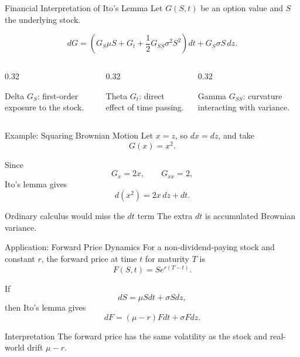\documentclass[aspectratio=169,11pt]{beamer}
\newcommand{\Ito}{Ito}
\begin{document}
\begin{frame}{Financial Interpretation of Ito's Lemma}
    Let \(G(S,t)\) be an option value and \(S\) the underlying stock.

    \[
        dG
        =
        \left(
            G_S\mu S+G_t+\frac{1}{2}G_{SS}\sigma^2S^2
        \right)dt
        +
        G_S\sigma S\,dz.
    \]

    \begin{columns}[T]
        \begin{column}{0.32\textwidth}
            \begin{block}{Delta}
                \(G_S\): first-order exposure to the stock.
            \end{block}
        \end{column}
        \begin{column}{0.32\textwidth}
            \begin{block}{Theta}
                \(G_t\): direct effect of time passing.
            \end{block}
        \end{column}
        \begin{column}{0.32\textwidth}
            \begin{block}{Gamma}
                \(G_{SS}\): curvature interacting with variance.
            \end{block}
        \end{column}
    \end{columns}
\end{frame}

\begin{frame}[label=ito_examples_main]{Example: Squaring Brownian Motion}
    Let \(x=z\), so \(dx=dz\), and take
    \[
        G(x)=x^2.
    \]

    Since
    \[
        G_x=2x,
        \qquad
        G_{xx}=2,
    \]
    \Ito's lemma gives
    \[
        d(x^2)=2x\,dz+dt.
    \]

    \begin{alertblock}{Ordinary calculus would miss the \(dt\) term}
        The extra \(dt\) is accumulated Brownian variance.
    \end{alertblock}

    \hyperlink{deriv_power}{}
\end{frame}

\begin{frame}[label=forward_main]{Application: Forward Price Dynamics}
    For a non-dividend-paying stock and constant \(r\), the forward price at time \(t\) for maturity \(T\) is
    \[
        F(S,t)=S e^{r(T-t)}.
    \]

    If
    \[
        dS=\mu Sdt+\sigma Sdz,
    \]
    then \Ito's lemma gives
    \[
        dF=(\mu-r)Fdt+\sigma Fdz.
    \]

    \begin{block}{Interpretation}
        The forward price has the same volatility as the stock and real-world drift \(\mu-r\).
    \end{block}

    \hyperlink{deriv_forward}{}
\end{frame}
\end{document}
